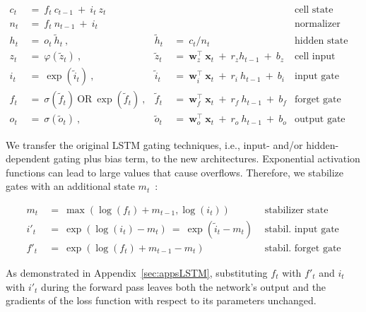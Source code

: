 \begin{align}
\label{eq:slstmforward}
c_t \ &= \  f_t \ c_{t-1} \ + \ i_t \ z_t & & 
 &\text{cell state} \\
n_t \ &= \  f_t \ n_{t-1} \ + \ i_t  & & 
 &\text{normalizer state} \\
h_t \ &= \ o_t \ \tilde{h}_t \ ,
  &\tilde{h}_t \ &= \ c_t / n_t
&\text{hidden state} \\
z_t \ &= \ \varphi \left( \tilde{z}_t \right) \ , 
  &\tilde{z}_t \ &=  \ \mathbf{w}^\top_{z} \ \mathbf{x}_t \ + \
  r_{z}  h_{t-1} \ + \  b_{z}
  &\text{cell input} \\
i_t \ &= \ \!\exp \left( \tilde{i}_t  \right) \ , 
  &\tilde{i}_t \ &= \ \mathbf{w}^\top_{i} \ \mathbf{x}_t \ + \
  r_{i}  \ h_{t-1} \ + \  b_{i}
  &\text{input gate} \\
f_t \ &= \ \sigma \left(  \tilde{f}_t \right) \ \text{OR} \
\!\exp \left(  \tilde{f}_t \right) \ ,
  &\tilde{f}_t \ &= \ \mathbf{w}^\top_{f} \ \mathbf{x}_t  \ + \
  r_{f}  \ h_{t-1} \ + \  b_{f}
  &\text{forget gate} \\
o_t \ &= \ \sigma \left( \tilde{o}_t \right) \ , 
  &\tilde{o}_t  \ &= \ \mathbf{w}^\top_{o} \ \mathbf{x}_t \ + \
  r_{o}  \ h_{t-1} \ + \  b_{o}
  &\text{output gate} 
\end{align}

We transfer the original LSTM gating techniques, i.e., input- and/or hidden-dependent gating plus bias term, to the new architectures. Exponential activation functions can lead to large values that cause overflows. Therefore, we stabilize gates with an additional state \mbox{$m_t$~\citep{Milakov:18arxiv}}:

\begin{align}
\label{eq:slstmstabil}
m_t \ &= \ \max \left( \log ( f_t ) + m_{t-1} , \log ( i_t ) \right) &\text{stabilizer state} \\
i'_t \ &= \ \!\exp \left( \log \left ( i_t \right) - m_t \right) \ = \ \!\exp \left( \tilde{i}_t - m_t \right) \ \, 
  &\text{stabil. input gate} \\
f'_t \ &= \ \!\exp \left( \log \left( f_t \right) + m_{t-1} - m_t \right) \ \, 
  &\text{stabil. forget gate}
\end{align}

As demonstrated in Appendix~\ref{sec:appsLSTM}, substituting $f_t$ with $f'_t$ and $i_t$ with $i'_t$ during the forward pass leaves both the network's output and the gradients of the loss function with respect to its parameters unchanged.

